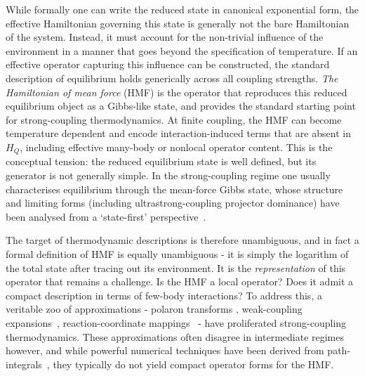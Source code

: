 \documentclass[aps,prl,twocolumn,superscriptaddress,showpacs,floatfix]{revtex4-2}
\begin{document}
While formally one can write the reduced state in canonical exponential form, the effective Hamiltonian governing this state is generally not the bare Hamiltonian of the system. Instead, it must account for the non-trivial influence of the environment in a manner that goes beyond the specification of temperature. If an effective operator capturing this influence can be constructed, the standard description of equilibrium holds generically across all coupling strengths. \emph{The Hamiltonian of mean force} (HMF) is the operator that reproduces this reduced equilibrium object as a Gibbs-like state, and provides the standard starting point for strong-coupling thermodynamics\cite{campisiFluctuationTheoremArbitrary2009,jarzynskiNonequilibriumWorkTheorem2004,jarzynskiStochasticMacroscopicThermodynamics2017,talknerColloquiumStatisticalMechanics2020,seifertFirstSecondLaw2016}. At finite coupling, the HMF can become temperature dependent and encode interaction-induced terms that are absent in $H_Q$, including effective many-body or nonlocal operator content\cite{talknerColloquiumStatisticalMechanics2020,seifertFirstSecondLaw2016,espositoNatureHeatStrongly2015,hanggiFiniteQuantumDissipation2008,ingoldSpecificHeatAnomalies2009,correaPotentialRenormalisationLamb2025}. This is the conceptual tension: the reduced equilibrium state is well defined, but its generator is not generally simple. In the strong-coupling regime one usually characterises equilibrium through the mean-force Gibbs state, whose structure and limiting forms (including ultrastrong-coupling projector dominance) have been analysed from a `state-first' perspective~\cite{cresserWeakUltrastrongCoupling2021a,trushechkinOpenQuantumSystem2022,hoggTutorialStochasticSimulation2024,hoggEnhancedEntanglement2024}. 

The target of thermodynamic descriptions is therefore unambiguous, and in fact a formal definition of HMF is equally unambiguous - it is simply the logarithm of the total state after tracing out its environment. It is the \emph{representation} of this operator that remains a challenge. Is the HMF a local operator? Does it admit a compact description in terms of few-body interactions? To address this, a veritable zoo of approximations - polaron transforms \cite{jangNonequilibriumTheoryElectronic2008}, weak-coupling expansions~\cite{cresserWeakUltrastrongCoupling2021a}, reaction-coordinate mappings~ \cite{ShubrookIlesSmithNazir2025, duGeneralizedHamiltonianMeanforce2025a,nazirReactionCoordinateMapping2018,AntoSztrikacsNazirSegal2023,IlesSmithDijkstraLambertNazir2016} - have proliferated strong-coupling thermodynamics. These approximations often disagree in intermediate regimes however, and while powerful numerical techniques have been derived from path-integrals~\cite{moixEquilibriumreducedDensityMatrix2012,chenRigorousStochasticMatrix2014,makriExploitingClassicalDecoherence2014,tanimuraReducedHierarchicalEquations2014,songCalculationCorrelatedInitial2015,WaltersWang2024}, they typically do not yield compact operator forms for the HMF.
\end{document}
